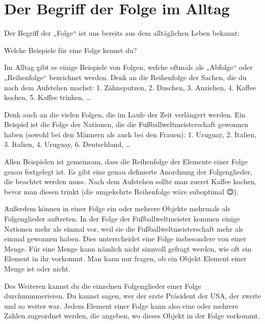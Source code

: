 \documentclass[fontsize=9pt,
               parskip=half-,
               DIV=14,
               listof=chapterentry,
               tocflat]{scrbook}
\begin{document}
\section{Der Begriff der Folge im Alltag}

Der Begriff der „Folge“ ist uns bereits aus dem alltäglichen Leben bekannt:

\begin{mdframed}[style=semanticbox,frametitleaboveskip=3pt,innerbottommargin=3pt,frametitle=Frage]
Welche Beispiele für eine Folge kennst du?

\end{mdframed}

\begin{answer*}
Im Alltag gibt es einige Beispiele von Folgen, welche oftmals als „Abfolge“ oder „Reihenfolge“ bezeichnet werden. Denk an die Reihenfolge der Sachen, die du nach dem Aufstehen machst: 1. Zähneputzen, 2. Duschen, 3. Anziehen, 4. Kaffee kochen, 5. Kaffee trinken, …

Denk auch an die vielen Folgen, die im Laufe der Zeit verlängert werden. Ein Beispiel ist die Folge der Nationen, die die Fußballweltmeisterschaft gewonnen haben (sowohl bei den Männern als auch bei den Frauen): 1. Uruguay, 2. Italien, 3. Italien, 4. Uruguay, 6. Deutschland, …

\end{answer*}

Allen Beispielen ist gemeinsam, dass die Reihenfolge der Elemente einer Folge genau festgelegt ist. Es gibt eine genau definierte Anordnung der Folgenglieder, die beachtet werden muss. Nach dem Aufstehen sollte man zuerst Kaffee kochen, bevor man diesen trinkt (die umgekehrte Reihenfolge wäre suboptimal {\DejaSans 😊}).

Außerdem können in einer Folge ein oder mehrere Objekte mehrmals als Folgenglieder auftreten. In der Folge der Fußballweltmeister kommen einige Nationen mehr als einmal vor, weil sie die Fußballweltmeisterschaft mehr als einmal gewonnen haben. Dies unterscheidet eine Folge insbesondere von einer Menge. Für eine Menge kann nämlich nicht sinnvoll gefragt werden, wie oft ein Element in ihr vorkommt. Man kann nur fragen, ob ein Objekt Element einer Menge ist oder nicht.

Des Weiteren kannst du die einzelnen Folgenglieder einer Folge durchnummerieren. Du kannst sagen, wer der erste Präsident der USA, der zweite und so weiter war. Jedem Element einer Folge kann also eine oder mehrere Zahlen zugeordnet werden, die angeben, wo dieses Objekt in der Folge vorkommt.
\end{document}
